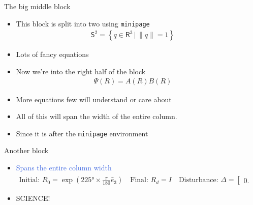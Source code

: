 \documentclass[final, usenames, dvipsnames]{beamer}
\newlength{\onecolwidth}
\newlength{\twocolwidth}
\def\Emph{\textcolor{RoyalBlue}}
\begin{document}
\begin{frame}[t]
\begin{columns}[T,onlytextwidth]
\begin{column}{\onecolwidth}
\end{column}  %

\begin{column}{\twocolwidth} %

\begin{block}{The big middle block} %
	\begin{minipage}{0.5\columnwidth} %
	\begin{itemize}
		\item This block is split into two using \texttt{minipage}
			\begin{align*}
				\mathsf{S}^2 = \left\{q \in \mathsf{R}^3 \,  \vert \, \| q \| = 1 \right\}
			\end{align*}
		\item Lots of fancy equations
	\end{itemize}
	\end{minipage}%
	\begin{minipage}{0.5\columnwidth}%
		\begin{itemize}
			\item Now we're into the right half of the block
				\begin{align*}
					\Psi(R) = A(R) B(R) 
				\end{align*}
			\item More equations few will understand or care about
		\end{itemize}
	\end{minipage}%
	
	\begin{itemize}
		\item All of this will span the width of the entire column.
		\item Since it is after the \texttt{minipage} environment
	\end{itemize}
\end{block} %

\begin{block}{Another block} %
	\begin{itemize}
		\item \Emph{Spans the entire column width} 
		\begin{align*}
			\text{Initial: } R_0 =  \exp(\ang{225} \times \frac{\pi}{180} \hat{e}_3) \quad \text{Final: } R_d = I \quad \text{Disturbance: } \Delta = \begin{bmatrix} 0.2 & 0.2 & 0.2 \end{bmatrix}^T
		\end{align*}
		\item SCIENCE!
	\end{itemize}
\end{block} %
\end{column}



\end{columns}
\end{frame}
\end{document}
